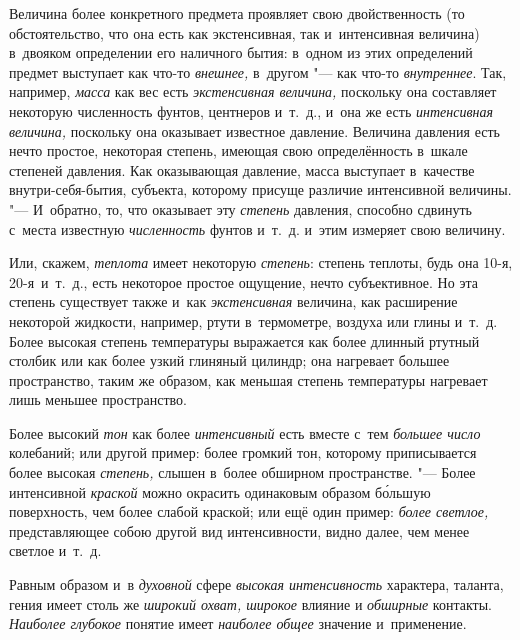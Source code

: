 Величина более конкретного предмета проявляет свою двойственность (то
обстоятельство, что она есть как экстенсивная, так и~интенсивная величина)
в~двояком определении его наличного бытия: в~одном из этих определений
предмет выступает как что-то {\em внешнее,} в~другом "--- как что-то
{\em внутреннее}. Так, например, {\em масса} как вес есть {\em экстенсивная
величина,} поскольку она составляет некоторую численность фунтов, центнеров
и~т.~д., и~она же есть {\em интенсивная величина,} поскольку она оказывает
известное давление. Величина давления есть нечто простое, некоторая степень,
имеющая свою определённость в~шкале степеней давления. Как оказывающая
давление, масса выступает в~качестве внутри-себя-бытия, субъекта, которому
присуще различие интенсивной величины. "--- И~обратно, то, что оказывает эту
{\em степень} давления, способно сдвинуть с~места известную {\em численность}
фунтов и~т.~д. и~этим измеряет свою величину.

Или, скажем, {\em теплота} имеет некоторую {\em степень}: степень теплоты, будь
она 10-я, 20-я~и~т.~д., есть некоторое простое ощущение, нечто субъективное. Но
эта степень существует также и~как {\em экстенсивная} величина, как расширение
некоторой жидкости, например, ртути в~термометре, воздуха или глины и~т.~д.
Более высокая степень температуры выражается как более длинный ртутный столбик
или как более узкий глиняный цилиндр; она нагревает большее пространство,
таким же образом, как меньшая степень температуры нагревает лишь меньшее
пространство.

Более высокий {\em тон} как более {\em интенсивный} есть вместе с~тем
{\em большее число} колебаний; или другой пример: более громкий тон,
которому приписывается более высокая {\em степень,} слышен в~более обширном
пространстве. "--- Более интенсивной {\em краской} можно окрасить одинаковым
образом б\'{о}льшую поверхность, чем более слабой краской; или ещё один пример:
{\em более светлое,} представляющее собою другой вид интенсивности, видно
далее, чем менее светлое и~т.~д.

Равным образом и~в {\em духовной} сфере {\em высокая интенсивность} характера,
таланта, гения имеет столь же {\em широкий охват, широкое}
влияние и {\em обширные} контакты.
{\em Наиболее глубокое} понятие имеет {\em наиболее общее}
значение и~применение.


